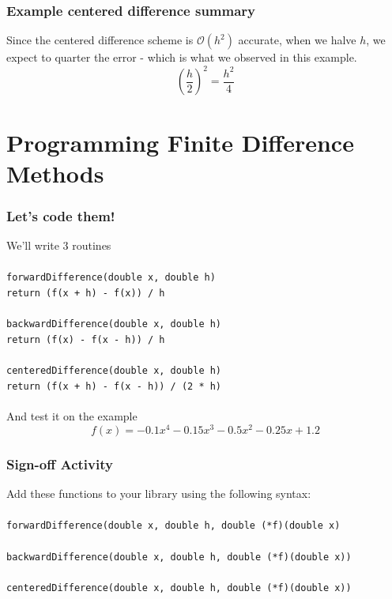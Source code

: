 \documentclass{if-beamer}
\begin{document}
\begin{frame}
\frametitle{Example centered difference summary}
Since the centered difference scheme is $\mathcal{O}(h^2)$ accurate, when we halve $h$, we expect to quarter the error - which is what we observed in this example.
$$\left(\frac{h}{2}\right)^2 = \frac{h^2}{4} $$ 
\end{frame}

\section{Programming Finite Difference Methods}
\begin{frame}
	\frametitle{Let's code them!}
	We'll write 3 routines\\
	\texttt{ }\\
	\texttt{forwardDifference(double x, double h)}\\
	\texttt{\qquad return (f(x + h) - f(x)) / h}\\
	\texttt{ }\\
	\texttt{backwardDifference(double x, double h)}\\
	\texttt{\qquad return (f(x) - f(x - h)) / h}\\
	\texttt{ }\\
	\texttt{centeredDifference(double x, double h)}\\
	\texttt{\qquad return (f(x + h) - f(x - h)) / (2 * h)}\\
	\texttt{ }\\
	And test it on the example
	$$f(x) = -0.1x^4-0.15x^3-0.5x^2-0.25x+1.2 $$
\end{frame}

\begin{frame}
	\frametitle{Sign-off Activity}
	Add these functions to your library using the following syntax:\\
	\texttt{ }\\
	\texttt{forwardDifference(double x, double h, double (*f)(double x)}\\
	\texttt{ }\\
	\texttt{backwardDifference(double x, double h, double (*f)(double x))}\\
	\texttt{ }\\
	\texttt{centeredDifference(double x, double h, double (*f)(double x))}\\
	\texttt{ }\\
\end{frame}
\end{document}

